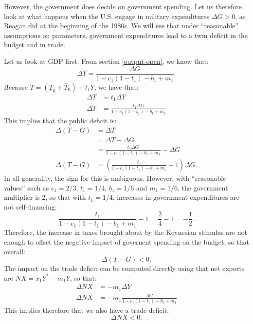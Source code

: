 \documentclass[]{book}
\begin{document}
However, the government does decide on government spending. Let us
therefore look at what happens when the U.S. engage in military
expenditures \(\Delta G>0\), as Reagan did at the beginning of the
1980s. We will see that under ``reasonable'' assumptions on parameters,
government expenditures lead to a twin deficit in the budget and in
trade.

Let us look at GDP first. From section \ref{output-open}, we know that:
\[\Delta Y = \frac{\Delta G}{1-c_1(1-t_1)-b_1+m_1}.\] Because
\(T=\left(\underline{T}_{0}+\bar{T}_{0}\right)+t_1 Y\), we have that: \[
\begin{aligned}
\Delta T &= t_1 \Delta Y\\
\Delta T&= \frac{t_1 \Delta G}{1-c_1(1-t_1)-b_1+m_1}
\end{aligned}
\] This implies that the public deficit is: \[
\begin{aligned}
\Delta (T-G)&=\Delta T\\
&= \Delta T - \Delta G \\
&= \frac{t_1 \Delta G}{1-c_1(1-t_1)-b_1+m_1} - \Delta G\\
\Delta (T-G)&=\left(\frac{t_1}{1-c_1(1-t_1)-b_1+m_1} - 1\right)\Delta G.
\end{aligned}
\] In all generality, the sign for this is ambiguous. However, with
``reasonable values'' such as \(c_1=2/3\), \(t_1=1/4\), \(b_1=1/6\) and
\(m_1=1/6\), the government multiplier is 2, so that with \(t_1=1/4\),
increases in government expenditures are not self-financing:
\[\frac{t_1}{1-c_1(1-t_1)-b_1+m_1} - 1 = \frac{2}{4}-1 = -\frac{1}{2}.\]
Therefore, the increase in taxes brought about by the Keynesian stimulus
are not enough to offset the negative impact of governent spending on
the budget, so that overall: \[\boxed{\Delta(T-G)<0}.\] The impact on
the trade deficit can be computed directly using that net exports are
\(NX=x_1 Y^{*} - m_1 Y\), so that: \[
\begin{aligned}
\Delta NX &= -m_1 \Delta Y\\
\Delta NX &= -m_1 \frac{\Delta G}{1-c_1(1-t_1)-b_1+m_1}
\end{aligned}
\] This implies therefore that we also have a trade deficit:
\[\boxed{\Delta NX <0}.\]
\end{document}
